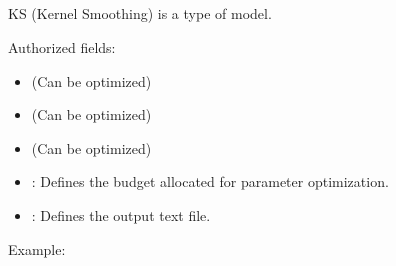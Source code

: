 \documentclass[letterpaper,10pt,english]{sphinxmanual}
\begin{document}
\subsection{}
\label{\detokenize{SgteLib:ks}}\label{\detokenize{SgteLib:id5}}
\begin{DUlineblock}{0em}
\item[] KS (Kernel Smoothing) is a type of model.
\item[] Authorized fields:
\end{DUlineblock}
\begin{itemize}
\item {} 
\sphinxAtStartPar
{\hyperref[\detokenize{SgteLib:kernel-type}]{}} (Can be optimized)

\item {} 
\sphinxAtStartPar
{\hyperref[\detokenize{SgteLib:kernel-shape}]{}} (Can be optimized)

\item {} 
\sphinxAtStartPar
{\hyperref[\detokenize{SgteLib:distance-type}]{}} (Can be optimized)

\item {} 
\sphinxAtStartPar
{\hyperref[\detokenize{SgteLib:budget}]{}}: Defines the budget allocated for parameter optimization.

\item {} 
\sphinxAtStartPar
{\hyperref[\detokenize{SgteLib:output}]{}}: Defines the output text file.

\end{itemize}

\begin{DUlineblock}{0em}
\item[] Example:
\item[] 
\end{DUlineblock}
\end{document}

